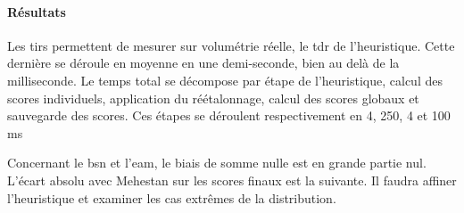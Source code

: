 \paragraph{Résultats}

Les tirs permettent de mesurer sur volumétrie réelle, le \gls{tdr} de l'heuristique. Cette dernière se déroule en moyenne en une demi-seconde, bien au delà de la milliseconde. Le temps total se décompose par étape de l'heuristique, calcul des scores individuels, application du réétalonnage, calcul des scores globaux et sauvegarde des scores. Ces étapes se déroulent respectivement en 4, 250, 4 et 100 ms


Concernant le \gls{bsn} et l'\gls{eam}, le biais de somme nulle est en grande partie nul. L'écart absolu avec Mehestan sur les scores finaux est la suivante. Il faudra affiner l'heuristique et examiner les cas extrêmes de la distribution.


\pagebreak